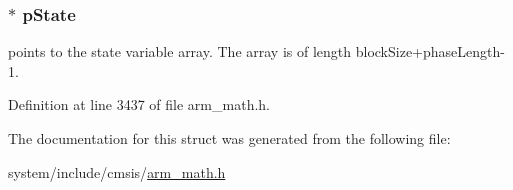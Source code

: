 \subsubsection[{\texorpdfstring{p\+State}{pState}}]{$\ast$ p\+State}\hypertarget{structarm__fir__interpolate__instance__q15_ae29dfdb736374fcddaeaec4b7770170c}{}\label{structarm__fir__interpolate__instance__q15_ae29dfdb736374fcddaeaec4b7770170c}
points to the state variable array. The array is of length block\+Size+phase\+Length-\/1. 

Definition at line 3437 of file arm\+\_\+math.\+h.



The documentation for this struct was generated from the following file\+:\begin{DoxyCompactItemize}
\item 
system/include/cmsis/\hyperlink{arm__math_8h}{arm\+\_\+math.\+h}\end{DoxyCompactItemize}
